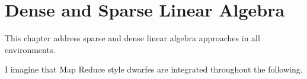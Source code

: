 \chapter{Dense and Sparse Linear Algebra}

This chapter address sparse and dense linear algebra approaches in all environments.

I imagine that Map Reduce style dwarfes are integrated throughout the following.
